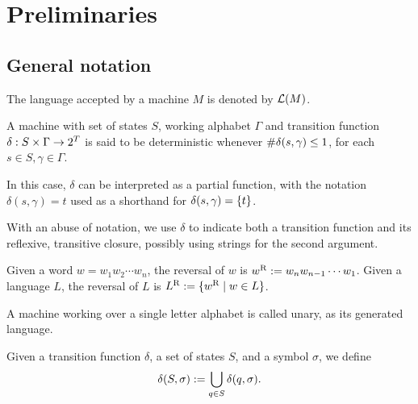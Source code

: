 \chapter{Preliminaries}



\section{General notation}
The language accepted by a machine $M$ is denoted by $\mathcal L(M)$.

\begin{defn}
	A machine with set of states $S$, working alphabet $\Gamma$ and transition function $\delta:S\times\Gamma\to2^{T}$ is said to be deterministic whenever $\# \delta(s,\gamma)\le1$, for each $s\in S,\gamma\in\Gamma$.

	In this case, $\delta$ can be interpreted as a partial function, with the notation $\delta(s,\gamma)=t$ used as a shorthand for $\delta(s,\gamma)=\{t\}$.
\end{defn}

With an abuse of notation, we use $\delta$ to indicate both a transition function and its reflexive, transitive closure, possibly using strings for the second argument.

Given a word $w=w_1 w_2\cdots w_n$, the reversal of $w$ is $w^{\mathrm R}:=w_n w_{n-1}\cdots w_1$.
Given a language $L$, the reversal of $L$ is $L^{\mathrm R}:=\{w^{\mathrm R} \mid w\in L\}$.

A machine working over a single letter alphabet is called unary, as its generated language.

Given a transition function $\delta$, a set of states $S$, and a symbol $\sigma$, we define
\begin{equation*}
	\delta(S,\sigma):=\bigcup_{q\in S} \delta(q,\sigma) \text.
\end{equation*}



